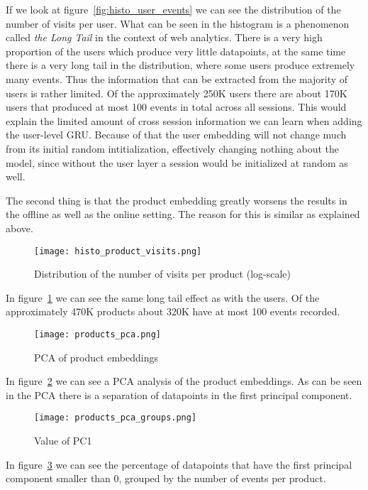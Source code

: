 If we look at figure~\ref{fig:histo_user_events} we can see the distribution of the number of visits per user.
What can be seen in the histogram is a phenomenon called \emph{the Long Tail} in the context of web analytics.
There is a very high proportion of the users which produce very little datapoints, at the same time there is a very long tail in the distribution, where some users produce extremely many events.
Thus the information that can be extracted from the majority of users is rather limited.
Of the approximately 250K users there are about 170K users that produced at most 100 events in total across all sessions.
This would explain the limited amount of cross session information we can learn when adding the user-level GRU.
Because of that the user embedding will not change much from its initial random intitialization, effectively changing nothing about the model, since without the user layer a session would be initialized at random as well.
\par
The second thing is that the product embedding greatly worsens the results in the offline as well as the online setting.
The reason for this is similar as explained above.
\begin{figure}[t]
	\centering
	\captionsetup{width=0.8\textwidth}
    \texttt{[image: histo\_product\_visits.png]}
    \caption{Distribution of the number of visits per product (log-scale)}
    \label{fig:histo_product_events}
\end{figure}
In figure~\ref{fig:histo_product_events} we can see the same long tail effect as with the users.
Of the approximately 470K products about 320K have at most 100 events recorded.
\begin{figure}[t]
	\centering
	\captionsetup{width=0.8\textwidth}
    \texttt{[image: products\_pca.png]}
    \caption{PCA of product embeddings}
    \label{fig:products_pca}
\end{figure}
In figure~\ref{fig:products_pca} we can see a PCA analysis of the product embeddings.
As can be seen in the PCA there is a separation of datapoints in the first principal component.
\begin{figure}[t]
	\centering
	\captionsetup{width=0.8\textwidth}
    \texttt{[image: products\_pca\_groups.png]}
    \caption{Value of PC1}
    \label{fig:products_pca_groups}
\end{figure}
In figure~\ref{fig:products_pca_groups} we can see the percentage of datapoints that have the first principal component smaller than 0, grouped by the number of events per product.
